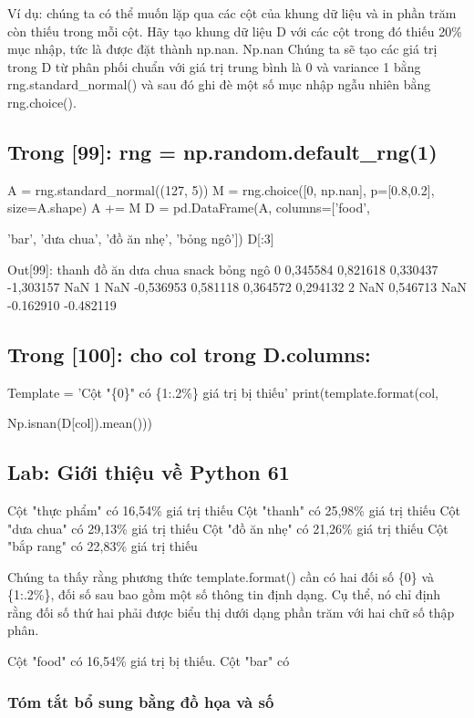 Ví dụ: chúng ta có thể muốn lặp qua các cột của khung dữ liệu và in phần trăm còn thiếu trong mỗi cột. Hãy tạo khung dữ liệu D với các cột trong đó thiếu 20\% mục nhập, tức là được đặt thành np.nan. Np.nan Chúng ta sẽ tạo các giá trị trong D từ phân phối chuẩn với giá trị trung bình là 0 và variance 1 bằng rng.standard\_normal() và sau đó ghi đè một số mục nhập ngẫu nhiên bằng rng.choice().

\subsection{Trong [99]: rng = np.random.default\_rng(1)}

A = rng.standard\_normal((127, 5)) M = rng.choice([0, np.nan], p=[0.8,0.2], size=A.shape) A += M D = pd.DataFrame(A, columns=['food',

'bar', 'dưa chua', 'đồ ăn nhẹ', 'bỏng ngô']) D[:3]

Out[99]: thanh đồ ăn dưa chua snack bỏng ngô 0 0,345584 0,821618 0,330437 -1,303157 NaN 1 NaN -0,536953 0,581118 0,364572 0,294132 2 NaN 0,546713 NaN -0.162910 -0.482119

\subsection{Trong [100]: cho col trong D.columns:}

Template = 'Cột "\{0\}" có \{1:.2\%\} giá trị bị thiếu' print(template.format(col,

Np.isnan(D[col]).mean()))

\subsection{Lab: Giới thiệu về Python 61}

Cột "thực phẩm" có 16,54\% giá trị thiếu Cột "thanh" có 25,98\% giá trị thiếu Cột "dưa chua" có 29,13\% giá trị thiếu Cột "đồ ăn nhẹ" có 21,26\% giá trị thiếu Cột "bắp rang" có 22,83\% giá trị thiếu

Chúng ta thấy rằng phương thức template.format() cần có hai đối số \{0\} và \{1:.2\%\}, đối số sau bao gồm một số thông tin định dạng. Cụ thể, nó chỉ định rằng đối số thứ hai phải được biểu thị dưới dạng phần trăm với hai chữ số thập phân.

Cột "food" có 16,54\% giá trị bị thiếu. Cột "bar" có

\subsubsection{Tóm tắt bổ sung bằng đồ họa và số}

